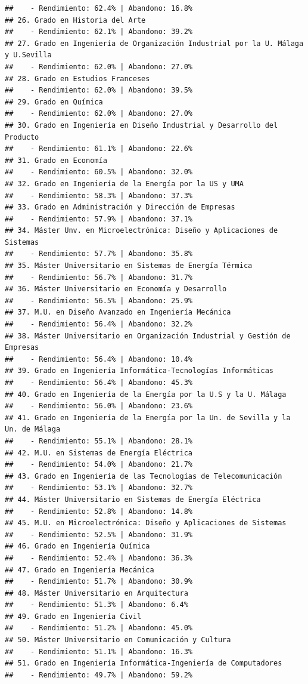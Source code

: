 \documentclass[
]{article}
\begin{document}
\begin{verbatim}
##    - Rendimiento: 62.4% | Abandono: 16.8%
## 26. Grado en Historia del Arte
##    - Rendimiento: 62.1% | Abandono: 39.2%
## 27. Grado en Ingeniería de Organización Industrial por la U. Málaga y U.Sevilla
##    - Rendimiento: 62.0% | Abandono: 27.0%
## 28. Grado en Estudios Franceses
##    - Rendimiento: 62.0% | Abandono: 39.5%
## 29. Grado en Química
##    - Rendimiento: 62.0% | Abandono: 27.0%
## 30. Grado en Ingeniería en Diseño Industrial y Desarrollo del Producto
##    - Rendimiento: 61.1% | Abandono: 22.6%
## 31. Grado en Economía
##    - Rendimiento: 60.5% | Abandono: 32.0%
## 32. Grado en Ingeniería de la Energía por la US y UMA
##    - Rendimiento: 58.3% | Abandono: 37.3%
## 33. Grado en Administración y Dirección de Empresas
##    - Rendimiento: 57.9% | Abandono: 37.1%
## 34. Máster Unv. en Microelectrónica: Diseño y Aplicaciones de Sistemas
##    - Rendimiento: 57.7% | Abandono: 35.8%
## 35. Máster Universitario en Sistemas de Energía Térmica
##    - Rendimiento: 56.7% | Abandono: 31.7%
## 36. Máster Universitario en Economía y Desarrollo
##    - Rendimiento: 56.5% | Abandono: 25.9%
## 37. M.U. en Diseño Avanzado en Ingeniería Mecánica
##    - Rendimiento: 56.4% | Abandono: 32.2%
## 38. Máster Universitario en Organización Industrial y Gestión de Empresas
##    - Rendimiento: 56.4% | Abandono: 10.4%
## 39. Grado en Ingeniería Informática-Tecnologías Informáticas
##    - Rendimiento: 56.4% | Abandono: 45.3%
## 40. Grado en Ingeniería de la Energía por la U.S y la U. Málaga
##    - Rendimiento: 56.0% | Abandono: 23.6%
## 41. Grado en Ingeniería de la Energía por la Un. de Sevilla y la Un. de Málaga
##    - Rendimiento: 55.1% | Abandono: 28.1%
## 42. M.U. en Sistemas de Energía Eléctrica
##    - Rendimiento: 54.0% | Abandono: 21.7%
## 43. Grado en Ingeniería de las Tecnologías de Telecomunicación
##    - Rendimiento: 53.1% | Abandono: 32.7%
## 44. Máster Universitario en Sistemas de Energía Eléctrica
##    - Rendimiento: 52.8% | Abandono: 14.8%
## 45. M.U. en Microelectrónica: Diseño y Aplicaciones de Sistemas
##    - Rendimiento: 52.5% | Abandono: 31.9%
## 46. Grado en Ingeniería Química
##    - Rendimiento: 52.4% | Abandono: 36.3%
## 47. Grado en Ingeniería Mecánica
##    - Rendimiento: 51.7% | Abandono: 30.9%
## 48. Máster Universitario en Arquitectura
##    - Rendimiento: 51.3% | Abandono: 6.4%
## 49. Grado en Ingeniería Civil
##    - Rendimiento: 51.2% | Abandono: 45.0%
## 50. Máster Universitario en Comunicación y Cultura
##    - Rendimiento: 51.1% | Abandono: 16.3%
## 51. Grado en Ingeniería Informática-Ingeniería de Computadores
##    - Rendimiento: 49.7% | Abandono: 59.2%

\end{verbatim}
\end{document}
